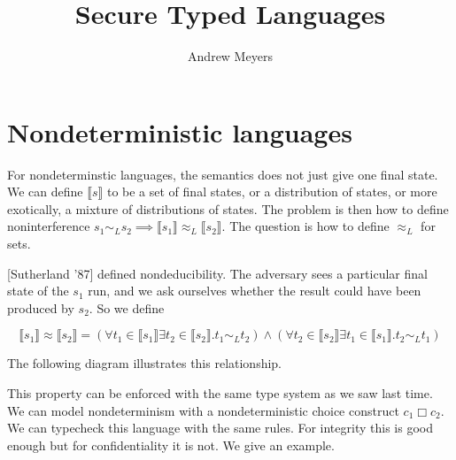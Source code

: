 \documentclass{article}
\begin{document}
\title{Secure Typed Languages}
\author{Andrew Meyers}
\maketitle

\section*{Nondeterministic languages}

For nondeterminstic languages, the semantics does not just give one final state. We can define $\llbracket s \rrbracket$ to be a set of final states, or a distribution of states, or more exotically,  a mixture of distributions of states. The problem is then how to define noninterference $s_1 \sim_L s_2 \implies \llbracket s_1 \rrbracket \approx_L \llbracket s_2 \rrbracket$. The question is how to define $\approx_L$ for sets. 

[Sutherland '87] defined nondeducibility. The adversary sees a particular final state of the $s_1$ run, and we ask ourselves whether the result could have been produced by $s_2$. So we define 

\[
\llbracket s_1 \rrbracket \approx \llbracket s_2 \rrbracket = 
(\forall t_1 \in \llbracket s_1 \rrbracket \exists t_2 \in \llbracket s_2 \rrbracket . t_1 \sim_L t_2) \wedge (\forall t_2 \in \llbracket s_2 \rrbracket \exists t_1 \in \llbracket s_1 \rrbracket . t_2 \sim_L t_1)
\]

The following diagram illustrates this relationship.

\newline
This property can be enforced with the same type system as we saw last time. We can model nondeterminism with a nondeterministic choice construct $c_1 \Box c_2$. We can typecheck this language with the same rules. For integrity this is good enough but for confidentiality it is not. We give an example.
\end{document}
